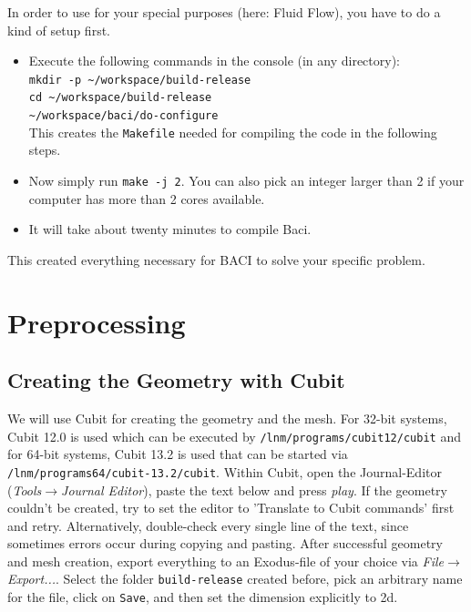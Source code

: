 In order to use \baci{} for your special purposes (here: Fluid Flow), you have
to do a kind of setup first.
\begin{itemize}
\item Execute the following commands in the console (in any directory):\\
\texttt{mkdir -p \textasciitilde{}/workspace/build-release}\\
\texttt{cd \textasciitilde{}/workspace/build-release}\\
\texttt{\textasciitilde{}/workspace/baci/do-configure}\\

This creates the \texttt{Makefile} needed for compiling the code in the following steps.
\item Now simply run \texttt{make -j 2}. You can also pick an integer larger than 2 if your computer has more than 2 cores available.
\item It will take about twenty minutes to compile Baci.
\end{itemize}
This created everything necessary for BACI to solve your specific problem.
\section{Preprocessing}

\subsection{Creating the Geometry with Cubit}
We will use Cubit for creating the geometry and the mesh. For 32-bit systems, Cubit 12.0 is used which can be executed by \texttt{/lnm/programs/cubit12/cubit} and for 64-bit systems, Cubit 13.2 is used that can be started via \texttt{/lnm/programs64/cubit-13.2/cubit}. Within Cubit, open the Journal-Editor (\emph{Tools}$\to$\emph{Journal
Editor}), paste the text below and press \emph{play}. If the geometry couldn't be created, try to set the editor to 'Translate to Cubit commands' first and retry. Alternatively, double-check every single line of the text, since sometimes errors occur during copying and pasting. After successful geometry and mesh creation, export everything to an Exodus-file of your choice via \emph{File}$\to$\emph{Export...}. Select the folder \texttt{build-release} created before, pick an arbitrary name for the file, click on \texttt{Save}, and then set the dimension explicitly to 2d.

